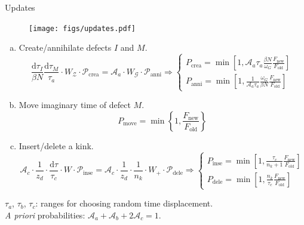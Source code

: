 \documentclass[aspectratio=43]{beamer}
\begin{document}
\begin{frame}{Updates}
  \vspace{-3mm}
  \begin{figure}[htpb]
    \texttt{[image: figs/updates.pdf]}
  \end{figure}
  \vspace{-9mm}
  \footnotesize
  \begin{enumerate}[(a)]
    \item Create/annihilate defects $I$ and $M$.
      {\scriptsize\useshortskip\[
        \frac{\mathrm{d}\tau_I}{\beta N}\frac{\mathrm{d}\tau_M}{\tau_a}\cdot W_\mathcal{Z}\cdot\mathcal{P}_\text{crea} = \mathcal{A}_a\cdot W_\mathcal{G}\cdot\mathcal{P}_\text{anni}
        \Rightarrow
        \begin{cases}
          P_\text{crea} = \min \left[ 1, \mathcal{A}_a \tau_a \frac{\beta N}{\omega_G}\frac{F_\text{new}}{F_\text{old}} \right]\\
          P_\text{anni} = \min\left[ 1, \frac{1}{\mathcal{A}_a \tau_a}\frac{\omega_G}{\beta N}\frac{F_\text{new}}{F_\text{old}} \right]
        \end{cases}
      \]}
    \item Move imaginary time of defect $M$.
      {\scriptsize\useshortskip\[
        P_\text{move} = \min\left\{1, \frac{F_\text{new}}{F_\text{old}}\right\}
      \]}
    \item Insert/delete a kink.
      {\scriptsize\useshortskip\[
        \mathcal{A}_c\cdot\frac{1}{z_d}\cdot\frac{\mathrm{d}\tau}{\tau_c}\cdot W\cdot \mathcal{P}_\text{inse} = \mathcal{A}_c\cdot\frac{1}{z_d}\cdot\frac{1}{n_k}\cdot W_+\cdot \mathcal{P}_\text{dele}
        \Rightarrow
        \begin{cases}
          P_\text{inse} = \min\left[1, \frac{\tau_c}{n_k+1}\frac{F_\text{new}}{F_\text{old}}\right]\\
          P_\text{dele} = \min\left[1, \frac{n_k}{\tau_c}\frac{F_\text{new}}{F_\text{old}}\right]
        \end{cases}
      \]}
  \end{enumerate}
  \vspace{-3mm}
  $\tau_a$, $\tau_b$, $\tau_c$: ranges for choosing random time displacement.\\
  \textit{A priori} probabilities: $\mathcal{A}_a+\mathcal{A}_b+2\mathcal{A}_c = 1$.
\end{frame}
\end{document}

